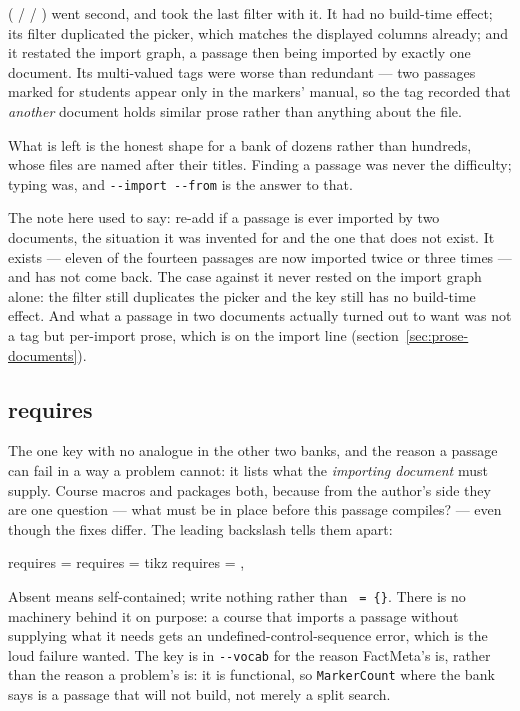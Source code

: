  ( /  / ) went second,
and took the last filter with it. It had no build-time effect; its filter
duplicated the picker, which matches the displayed columns already; and it
restated the import graph, a passage then being imported by exactly one document.
Its multi-valued tags were worse than redundant --- two passages marked for
students appear only in the markers' manual, so the tag recorded that
\emph{another} document holds similar prose rather than anything about the file.

What is left is the honest shape for a bank of dozens rather than hundreds, whose
files are named after their titles. Finding a passage was never the difficulty;
typing  was, and \texttt{-{}-import -{}-from} is the
answer to that.

The note here used to say: re-add  if a passage is ever imported by
two documents, the situation it was invented for and the one that does not exist.
It exists --- eleven of the fourteen passages are now imported twice or three
times --- and  has not come back. The case against it never rested
on the import graph alone: the filter still duplicates the picker and the key
still has no build-time effect. And what a passage in two documents actually
turned out to want was not a tag but per-import prose, which is  on the
import line (section~\ref{sec:prose-documents}).

\subsection*{requires}

The one key with no analogue in the other two banks, and the reason a passage can
fail in a way a problem cannot: it lists what the \emph{importing document} must
supply. Course macros and packages both, because from the author's side they are
one question --- what must be in place before this passage compiles? --- even
though the fixes differ. The leading backslash tells them apart:

\begin{manexsource}
requires = {\MarkerCount}            %
requires = {tikz}                    %
requires = {\MarkerCount, \PointsPerQuestion}
\end{manexsource}

\noindent Absent means self-contained; write nothing rather than
\texttt{ = \{\}}. There is no machinery behind it on purpose: a
course that imports a passage without supplying what it needs gets an
undefined-control-sequence error, which is the loud failure wanted. The key is in
\texttt{-{}-vocab} for the reason FactMeta's  is, rather than the
reason a problem's  is: it is functional, so \texttt{MarkerCount}
where the bank says  is a passage that will not build, not merely
a split search.

